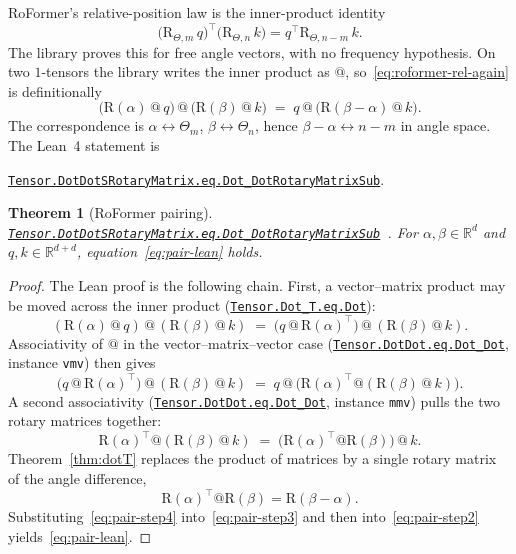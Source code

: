 \documentclass[11pt,a4paper]{article}
\newcommand{\lmod}[1]{\href{http://www.lemma.cn/lean/?module=#1}{\nolinkurl{#1}}}
\newtheorem{theorem}{Theorem}[section]
\newcommand{\R}{\mathbb{R}}
\newcommand{\rot}{\mathrm{R}}
\begin{document}
RoFormer's relative-position law is the inner-product identity
\begin{equation}
  \label{eq:roformer-rel-again}
  \bigl(\rot_{\Theta,m}\,q\bigr)^\top\bigl(\rot_{\Theta,n}\,k\bigr)
  = q^\top \rot_{\Theta,n-m}\,k.
\end{equation}
The library proves this for free angle vectors, with no frequency hypothesis.
On two \(1\)-tensors the library writes the inner product as \(@\), so~\eqref{eq:roformer-rel-again} is definitionally
\begin{equation}
  \label{eq:pair-lean}
  \bigl(\rot(\alpha)\,@\,q\bigr)\,@\,\bigl(\rot(\beta)\,@\,k\bigr)
  \;=\;
  q\,@\,\bigl(\rot(\beta-\alpha)\,@\,k\bigr).
\end{equation}
The correspondence is \(\alpha\leftrightarrow\Theta_m\), \(\beta\leftrightarrow\Theta_n\), hence \(\beta-\alpha\leftrightarrow n-m\) in angle space.
The Lean~4 statement is
\begin{center}
\lmod{Tensor.DotDotSRotaryMatrix.eq.Dot_DotRotaryMatrixSub}.
\end{center}

\begin{theorem}[RoFormer pairing]
\label{thm:pair}
\lmod{Tensor.DotDotSRotaryMatrix.eq.Dot_DotRotaryMatrixSub}~\cite{lemma_rope_pair}.
For \(\alpha,\beta\in\R^d\) and \(q,k\in\R^{d+d}\),
equation~\eqref{eq:pair-lean} holds.
\end{theorem}

\begin{proof}
The Lean proof is the following chain.
First, a vector--matrix product may be moved across the inner product
(\lmod{Tensor.Dot_T.eq.Dot}):
\begin{equation}
  \label{eq:pair-step1}
  (\rot(\alpha)\,@\,q)\,@\,(\rot(\beta)\,@\,k)
  \;=\;
  \bigl(q\,@\,\rot(\alpha)^\top\bigr)\,@\,(\rot(\beta)\,@\,k).
\end{equation}
Associativity of \(@\) in the vector--matrix--vector case
(\lmod{Tensor.DotDot.eq.Dot_Dot}, instance \texttt{vmv}) then gives
\begin{equation}
  \label{eq:pair-step2}
  \bigl(q\,@\,\rot(\alpha)^\top\bigr)\,@\,(\rot(\beta)\,@\,k)
  \;=\;
  q\,@\,\bigl(\rot(\alpha)^\top @ (\rot(\beta)\,@\,k)\bigr).
\end{equation}
A second associativity
(\lmod{Tensor.DotDot.eq.Dot_Dot}, instance \texttt{mmv}) pulls the two rotary matrices together:
\begin{equation}
  \label{eq:pair-step3}
  \rot(\alpha)^\top @ (\rot(\beta)\,@\,k)
  \;=\;
  \bigl(\rot(\alpha)^\top @ \rot(\beta)\bigr)\,@\,k.
\end{equation}
Theorem~\ref{thm:dotT} replaces the product of matrices by a single rotary matrix of the angle difference,
\begin{equation}
  \label{eq:pair-step4}
  \rot(\alpha)^\top @ \rot(\beta) = \rot(\beta-\alpha).
\end{equation}
Substituting~\eqref{eq:pair-step4} into~\eqref{eq:pair-step3} and then into~\eqref{eq:pair-step2} yields~\eqref{eq:pair-lean}.
\end{proof}
\end{document}
